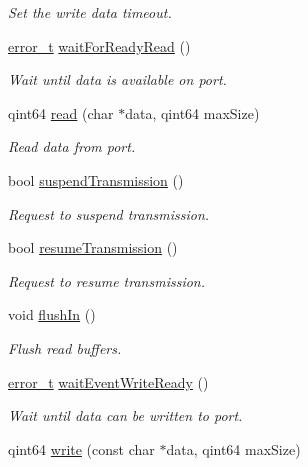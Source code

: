 \begin{DoxyCompactItemize}
\begin{DoxyCompactList}\small\item\em Set the write data timeout. \end{DoxyCompactList}\item 
\hyperlink{classmdt_abstract_port_ad4121bb930c95887e77f8bafa065a85e}{error\_\-t} \hyperlink{classmdt_serial_port_ad150a45c68d98a501bea2f102aeadb50}{waitForReadyRead} ()
\begin{DoxyCompactList}\small\item\em Wait until data is available on port. \end{DoxyCompactList}\item 
qint64 \hyperlink{classmdt_serial_port_a12274d7956b2af961ccdd36cfc2052cc}{read} (char $\ast$data, qint64 maxSize)
\begin{DoxyCompactList}\small\item\em Read data from port. \end{DoxyCompactList}\item 
bool \hyperlink{classmdt_serial_port_a9412faf413eca5ee3516139fdfaaf2fe}{suspendTransmission} ()
\begin{DoxyCompactList}\small\item\em Request to suspend transmission. \end{DoxyCompactList}\item 
bool \hyperlink{classmdt_serial_port_a02fd5ee74a7f52c3bce0545ec8a659bf}{resumeTransmission} ()
\begin{DoxyCompactList}\small\item\em Request to resume transmission. \end{DoxyCompactList}\item 
void \hyperlink{classmdt_serial_port_a597d013bbe18b1f946b99f68a4856a87}{flushIn} ()
\begin{DoxyCompactList}\small\item\em Flush read buffers. \end{DoxyCompactList}\item 
\hyperlink{classmdt_abstract_port_ad4121bb930c95887e77f8bafa065a85e}{error\_\-t} \hyperlink{classmdt_serial_port_a988825b3ff2ef93a1b43e2df316055bd}{waitEventWriteReady} ()
\begin{DoxyCompactList}\small\item\em Wait until data can be written to port. \end{DoxyCompactList}\item 
qint64 \hyperlink{classmdt_serial_port_a282f99035c032fbb6fa86ccd10deb597}{write} (const char $\ast$data, qint64 maxSize)

\end{DoxyCompactItemize}

